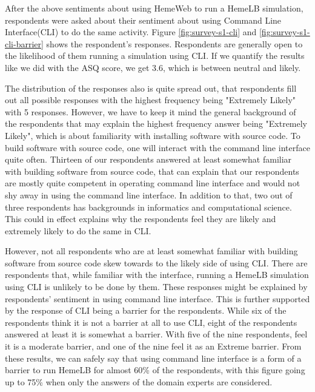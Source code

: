 \vspace{0.5cm}

After the above sentiments about using HemeWeb to run a HemeLB simulation, respondents were asked about their sentiment about using Command Line Interface(CLI) to do the same activity. Figure \ref{fig:survey-s1-cli} and \ref{fig:survey-s1-cli-barrier} shows the respondent's responses. Respondents are generally open to the likelihood of them running a simulation using CLI. If we quantify the results like we did with the ASQ score, we get 3.6, which is between neutral and likely. 

The distribution of the responses also is quite spread out, that respondents fill out all possible responses with   the highest frequency being "Extremely Likely" with 5 responses. However, we have to keep it mind the general background of the respondents that may explain the highest frequency answer being "Extremely Likely", which is about familiarity with installing software with source code. To build software with source code, one will interact with the command line interface quite often. Thirteen of our respondents answered at least somewhat familiar with building software from source code, that can explain that our respondents are mostly quite competent in operating command line interface and would not shy away in using the command line interface. In addition to that, two out of three respondents has backgrounds in informatics and computational science. This could in effect explains why the respondents feel they are likely and extremely likely to do the same in CLI. 

However, not all respondents who are at least somewhat familiar with building software from source code skew towards to the likely side of using CLI. There are respondents that, while familiar with the interface, running a HemeLB simulation using CLI is unlikely to be done by them. These responses might be explained by respondents' sentiment in using command line interface. This is further supported by the response of CLI being a barrier for the respondents. While six of the respondents think it is not a barrier at all to use CLI, eight of the respondents answered at least it is somewhat a barrier. With five of the nine respondents, feel it is a moderate barrier, and one of the nine feel it as an Extreme barrier. From these results, we can safely say that using command line interface is a form of a barrier to run HemeLB for almost 60\% of the respondents, with this figure going up to 75\% when only the answers of the domain experts are considered.





